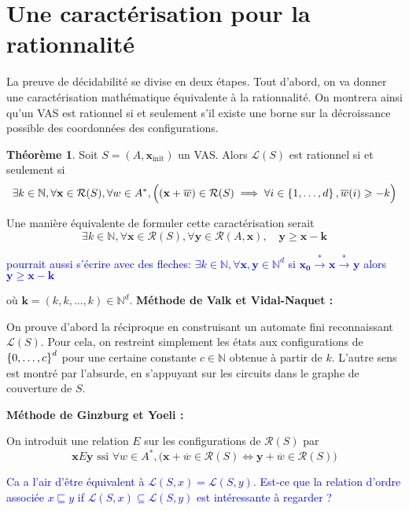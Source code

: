 \documentclass[a4paper,final]{article}
\theoremstyle{definition}
\newtheorem{Theorem}{Théorème}
\let\geq\geqslant
\newcommand{\alain}[1]{\textcolor{blue}{#1}}
\newcommand{\os}[1]{\left\{\mathinner{#1}\right\}}
\newcommand{\N}{\ensuremath{\mathbb{N}}}
\newcommand{\lang}{\ensuremath{\mathcal{L}}}
\newcommand{\trans}[2]{\ensuremath{\stackrel{#1}{\longrightarrow}_{#2}}}
\newcommand{\vect}[1]{\ensuremath{\mathbf{#1}}}
\newcommand{\conf}[1]{\ensuremath{\mathcal{R}(#1)}}
\newcommand{\rel}{\ensuremath{E}}
\newcommand{\ssi}{\ensuremath{\text{ ssi }}}
\newcommand{\equivaut}{\ensuremath{\Leftrightarrow}}
\newcommand{\xinit}{\ensuremath{\vect{x}_\text{init}}}
\newcommand{\valeur}[1]{\ensuremath{\overline{#1}}}
\begin{document}

\section{Une caractérisation pour la rationnalité}

La preuve de décidabilité se divise en deux étapes.
Tout d'abord, on va donner une caractérisation mathématique équivalente à la rationnalité.
On montrera ainsi qu'un VAS est rationnel si et seulement s'il existe une borne sur la décroissance possible des coordonnées des configurations.

\begin{Theorem}\cite{}
    Soit $S=(A,\xinit)$ un VAS.
    Alors $\lang(S)$ est rationnel si et seulement si 
    $$\exists k\in\N, \forall \vect{x}\in\conf{S}, \forall w\in A^\ast, 
    \Big( (\vect{x} +\valeur{w})\in\conf{S} \implies \forall i\in\os{1,\dots,d}, \valeur{w}(i)\geq -k\Big)$$
\end{Theorem}

Une manière équivalente de formuler cette caractérisation serait
$$\exists k\in\N, \forall \vect{x}\in\conf{S}, \forall \vect{y}\in\conf{A,\vect{x}}, \quad
\vect{y}\geq \vect{x} -\vect{k}$$

\alain{pourrait aussi s'écrire avec des fleches: $ \exists k\in\N, \forall \vect{x,y}\in \N^d$ si $\vect{x_0}\trans{*}{} \vect{x} \trans{*}{} \vect{y}$ alors $\vect{y}\geq \vect{x} -\vect{k}$}

où $\vect{k} = (k,k,...,k)\in\N^d$.
\textbf{Méthode de Valk et Vidal-Naquet :}

On prouve d'abord la réciproque en construisant un automate fini reconnaissant $\lang(S)$.
Pour cela, on restreint simplement les états aux configurations de $\os{0,\dots,c}^d$ pour une certaine constante $c\in\N$ obtenue à partir de $k$.
L'autre sens est montré par l'absurde, en s'appuyant sur les circuits dans le graphe de couverture de $S$.


\textbf{Méthode de Ginzburg et Yoeli :}

On introduit une relation $\rel$ sur les configurations de $\conf{S}$ par
$$\vect{x}\rel\vect{y} \ssi \forall w\in A^\ast, 
\Big( \vect{x} +\valeur{w}\in\conf{S} \equivaut \vect{y} +\valeur{w}\in\conf{S} \Big)$$

\alain{Ca a l'air d'être équivalent à $\lang(S,x)=\lang(S,y)$. Est-ce que la relation d'ordre associée $x \sqsubseteq  y$ if $\lang(S,x) \subseteq \lang(S,y)$ est intéressante à regarder ?}
\end{document}

